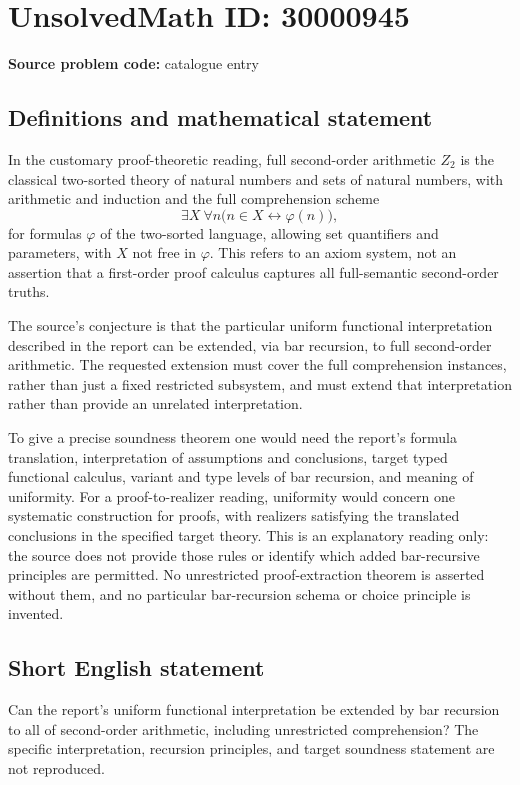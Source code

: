 \documentclass[11pt]{article}
\begin{document}
\section*{UnsolvedMath ID: 30000945}
\textbf{Source problem code:} catalogue entry
\subsection{Definitions and mathematical statement}
In the customary proof-theoretic reading, full second-order arithmetic \(Z_2\) is the classical two-sorted theory of natural numbers and sets of natural numbers, with arithmetic and induction and the full comprehension scheme
\[
\exists X\ \forall n\bigl(n\in X\leftrightarrow\varphi(n)\bigr),
\]
for formulas \(\varphi\) of the two-sorted language, allowing set quantifiers and parameters, with \(X\) not free in \(\varphi\). This refers to an axiom system, not an assertion that a first-order proof calculus captures all full-semantic second-order truths.

The source's conjecture is that the particular uniform functional interpretation described in the report can be extended, via bar recursion, to full second-order arithmetic. The requested extension must cover the full comprehension instances, rather than just a fixed restricted subsystem, and must extend that interpretation rather than provide an unrelated interpretation.

To give a precise soundness theorem one would need the report's formula translation, interpretation of assumptions and conclusions, target typed functional calculus, variant and type levels of bar recursion, and meaning of uniformity. For a proof-to-realizer reading, uniformity would concern one systematic construction for proofs, with realizers satisfying the translated conclusions in the specified target theory. This is an explanatory reading only: the source does not provide those rules or identify which added bar-recursive principles are permitted. No unrestricted proof-extraction theorem is asserted without them, and no particular bar-recursion schema or choice principle is invented.
\subsection{Short English statement}
Can the report's uniform functional interpretation be extended by bar recursion to all of second-order arithmetic, including unrestricted comprehension? The specific interpretation, recursion principles, and target soundness statement are not reproduced.
\end{document}
